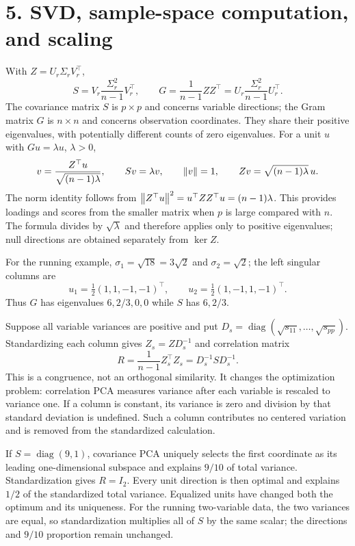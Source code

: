 \section*{5. SVD, sample-space computation, and scaling}
With $Z=U_r\Sigma_rV_r^\top$,
\[
S=V_r\frac{\Sigma_r^2}{n-1}V_r^\top,\qquad
G=\frac1{n-1}ZZ^\top=U_r\frac{\Sigma_r^2}{n-1}U_r^\top.
\]
The covariance matrix $S$ is $p\times p$ and concerns variable directions;
the Gram matrix $G$ is $n\times n$ and concerns observation coordinates.
They share their positive eigenvalues, with potentially different counts
of zero eigenvalues. For a unit $u$ with $Gu=\lambda u$, $\lambda>0$,
\[
v=\frac{Z^\top u}{\sqrt{(n-1)\lambda}},\qquad
Sv=\lambda v,\qquad \left\lVert v\right\rVert=1,
\qquad Zv=\sqrt{(n-1)\lambda}\,u.
\]
The norm identity follows from
$\left\lVert Z^\top u\right\rVert^2=u^\top ZZ^\top u=(n-1)\lambda$.
This provides loadings and scores from the smaller matrix when $p$ is
large compared with $n$. The formula divides by $\sqrt\lambda$ and
therefore applies only to positive eigenvalues; null directions are
obtained separately from $\ker Z$.

For the running example, $\sigma_1=\sqrt{18}=3\sqrt2$ and
$\sigma_2=\sqrt2$; the left singular columns are
\[
u_1=\tfrac12(1,1,-1,-1)^\top,\qquad
u_2=\tfrac12(1,-1,1,-1)^\top.
\]
Thus $G$ has eigenvalues $6,2/3,0,0$ while $S$ has $6,2/3$.

Suppose all variable variances are positive and put
$D_s=\operatorname{diag}(\sqrt{s_{11}},\ldots,\sqrt{s_{pp}})$.
Standardizing each column gives $Z_s=ZD_s^{-1}$ and correlation matrix
\[
R=\frac1{n-1}Z_s^\top Z_s=D_s^{-1}SD_s^{-1}.
\]
This is a congruence, not an orthogonal similarity. It changes the
optimization problem: correlation PCA measures variance after each
variable is rescaled to variance one. If a column is constant, its
variance is zero and division by that standard deviation is undefined.
Such a column contributes no centered variation and is removed from
the standardized calculation.

\begin{example}
If $S=\operatorname{diag}(9,1)$, covariance PCA uniquely selects the
first coordinate as its leading one-dimensional subspace and explains
$9/10$ of total variance. Standardization gives $R=I_2$.
Every unit direction is then optimal and explains $1/2$ of the standardized
total variance. Equalized units have changed both the optimum and its
uniqueness. For the running two-variable data, the two variances are
equal, so standardization multiplies all of $S$ by the same scalar;
the directions and $9/10$ proportion remain unchanged.
\end{example}

